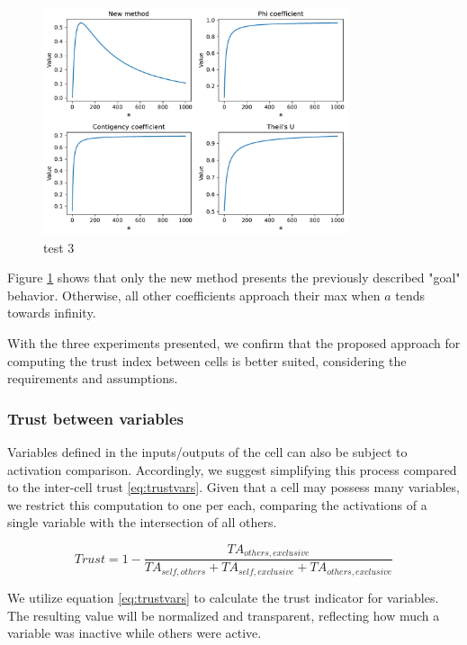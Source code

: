 \begin{figure}[h!]
\centering
    \includegraphics[width=0.8\textwidth]{figures/chapter4/cell/trust_tests/3.pdf}
    \caption{test 3}
    \label{fig:trust_test_3}
\end{figure}
\FloatBarrier

Figure \ref{fig:trust_test_3} shows that only the new method presents the previously described "goal" behavior. Otherwise, all other coefficients approach their max when $a$ tends towards infinity.

With the three experiments presented, we confirm that the proposed approach for computing the trust index between cells is better suited, considering the requirements and assumptions.

\subsubsection{Trust between variables}

Variables defined in the inputs/outputs of the cell can also be subject to activation comparison. Accordingly, we suggest simplifying this process compared to the inter-cell trust \ref{eq:trustvars}. Given that a cell may possess many variables, we restrict this computation to one per each, comparing the activations of a single variable with the intersection of all others.

\begin{equation} \label{eq:trustvars}
    Trust = 1 - \frac{TA_{others, exclusive}}{TA_{self,others} + TA_{self, exclusive} + TA_{others, exclusive}}
\end{equation}

We utilize equation \ref{eq:trustvars} to calculate the trust indicator for variables. The resulting value will be normalized and transparent, reflecting how much a variable was inactive while others were active.

